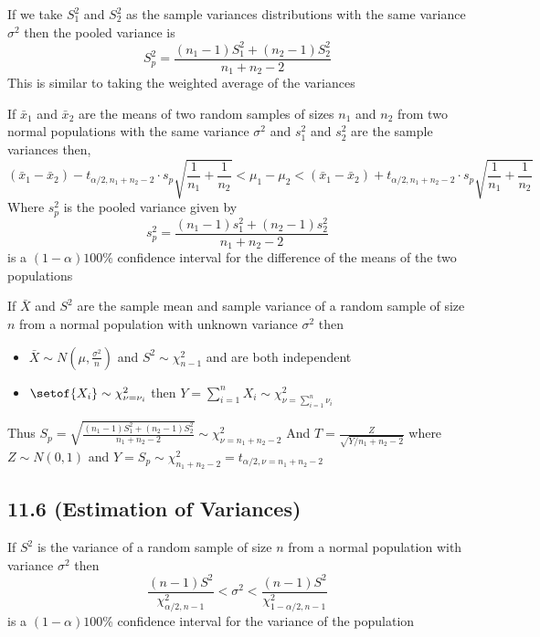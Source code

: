 \documentclass[answers,12pt,addpoints]{exam}
\begin{document}
\begin{definition}
    If we take $S_1^2$ and $S_2^2$ as the sample variances distributions with the same variance $\sigma^2$ then the pooled variance is
    $$ S_p^2 = \frac{(n_1 - 1)S_1^2 + (n_2 - 1)S_2^2}{n_1 + n_2 - 2}$$
    This is similar to taking the weighted average of the variances
\end{definition}

\begin{definition}[CI of Difference of 2 means with $\sigma_1^2 = \sigma_2^2 = \sigma^2$ unknown]
    If $\bar{x}_1$ and $\bar{x}_2$ are the means of two random samples of sizes $n_1$ and $n_2$ from two normal populations with the same variance $\sigma^2$ and $s_1^2$ and $s_2^2$ are the sample variances then,
    $$(\bar{x}_1 - \bar{x}_2) - t_{\alpha/2, n_1 +n_2 -2} \cdot s_p \sqrt{\frac{1}{n_1} + \frac{1}{n_2}} < \mu_1 - \mu_2< (\bar{x}_1 - \bar{x}_2) + t_{\alpha/2, n_1 +n_2 -2} \cdot s_p \sqrt{\frac{1}{n_1} + \frac{1}{n_2}}$$
    Where $s_p^2$ is the pooled variance given by 
    $$ s_p^2 = \frac{(n_1 - 1)s_1^2 + (n_2 - 1)s_2^2}{n_1 + n_2 - 2}$$
    is a $(1-\alpha)100$\% confidence interval for the difference of the means of the two populations
\end{definition}

\begin{remark}
    If $\bar{X}$ and $S^2$ are the sample mean and sample variance of a random sample of size $n$ from a normal population with unknown variance $\sigma^2$ then
    \begin{itemize}
        \item $\bar{X} \sim N(\mu, \frac{\sigma^2}{n})$ and $S^2 \sim \chi^2_{n-1}$ and are both independent
        \item $\setof{X_i} \sim \chi^2_{\nu = \nu_i}$ then $Y = \sum_{i=1}^{n} X_i \sim \chi^2_{\nu = \sum_{i=1}^{n} \nu_i}$
    \end{itemize} 
    Thus $S_p = \sqrt{\frac{(n_1 - 1)S_1^2 + (n_2 - 1)S_2^2}{n_1 + n_2 - 2}} \sim \chi^2_{\nu = n_1 + n_2 - 2}$ 
    And $T = \frac{Z}{\sqrt{Y/n_1 + n_2 -2}}$ where $Z \sim N(0,1)$ and $Y = S_p \sim \chi^2_{n_1 + n_2 - 2} = t_{\alpha/2, \nu = n_1 + n_2 -2}$
\end{remark}

\subsection{11.6 (Estimation of Variances)}
\begin{definition}
    If $S^2$ is the variance of a random sample of size $n$ from a normal population with variance $\sigma^2$ then
    $$ \frac{(n-1)S^2}{\chi^2_{\alpha/2, n-1}} < \sigma^2 < \frac{(n-1)S^2}{\chi^2_{1-\alpha/2, n-1}}$$
    is a $(1-\alpha)100$\% confidence interval for the variance of the population
\end{definition}
\end{document}
